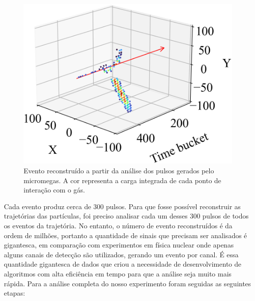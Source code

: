 \documentclass[a4paper,12pt,oneside]{book}
\begin{document}
\begin{figure}[H]
    \centering
    \includegraphics[scale = 0.40]{figs/event_cap_exp.png}
    \caption{Evento reconstruído a partir da análise dos pulsos gerados pelo micromegas. A cor representa a carga integrada de cada ponto de interação com o gás.}
    \label{fig:event_cap_exp}
\end{figure}

\par Cada evento produz cerca de 300 pulsos. Para que fosse possível reconstruir as trajetórias das partículas, foi preciso analisar cada um desses 300 pulsos de todos os eventos da trajetória. No entanto, o número de evento reconstruídos é da ordem de milhões, portanto a quantidade de sinais que precisam ser analisados é gigantesca, em comparação com experimentos em física nuclear onde apenas alguns canais de detecção são utilizados, gerando um evento por canal. É essa quantidade gigantesca de dados que criou a necessidade de desenvolvimento de algoritmos com alta eficiência em tempo para que a análise seja muito mais rápida. Para a análise completa do nosso experimento foram seguidas as seguintes etapas:

\end{document}
